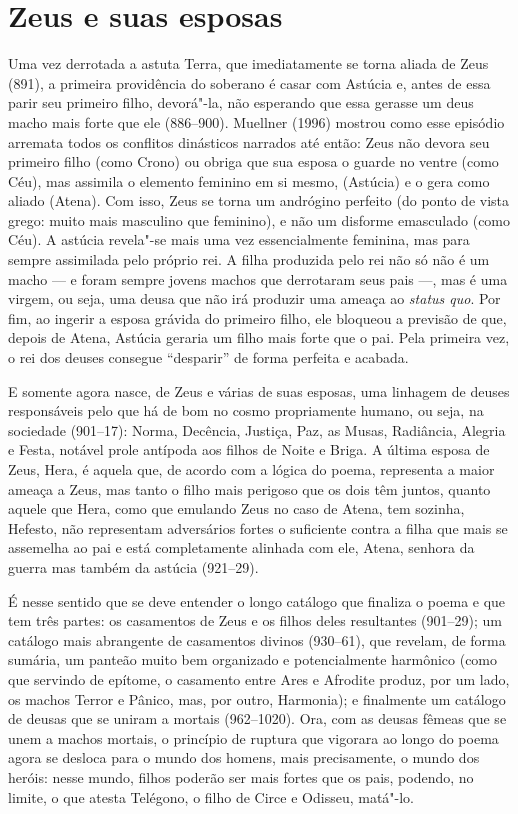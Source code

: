 \section{Zeus e suas esposas}

Uma vez derrotada a astuta Terra, que imediatamente se torna aliada de
Zeus (891), a primeira providência do soberano é casar com Astúcia e,
antes de essa parir seu primeiro filho, devorá"-la, não esperando que
essa gerasse um deus macho mais forte que ele (886--900). Muellner (1996)
mostrou como esse episódio arremata todos os conflitos dinásticos
narrados até então: Zeus não devora seu primeiro filho (como Crono) ou
obriga que sua esposa o guarde no ventre (como Céu), mas assimila o
elemento feminino em si mesmo, (Astúcia) e o gera como aliado (Atena).
Com isso, Zeus se torna um andrógino perfeito (do ponto de vista grego:
muito mais masculino que feminino), e não um disforme emasculado (como
Céu). A astúcia revela"-se mais uma vez essencialmente feminina, mas para
sempre assimilada pelo próprio rei. A filha produzida pelo rei não só
não é um macho --- e foram sempre jovens machos que derrotaram seus pais
---, mas é uma virgem, ou seja, uma deusa que não irá produzir uma ameaça
ao \emph{status quo}. Por fim, ao ingerir a esposa grávida do primeiro
filho, ele bloqueou a previsão de que, depois de Atena, Astúcia geraria
um filho mais forte que o pai. Pela primeira vez, o rei dos deuses
consegue ``desparir'' de forma perfeita e acabada.

E somente agora nasce, de Zeus e várias de suas esposas, uma linhagem de
deuses responsáveis pelo que há de bom no cosmo propriamente humano, ou
seja, na sociedade (901--17): Norma, Decência, Justiça, Paz, as Musas,
Radiância, Alegria e Festa, notável prole antípoda aos filhos de Noite e
Briga. A última esposa de Zeus, Hera, é aquela que, de acordo com a
lógica do poema, representa a maior ameaça a Zeus, mas tanto o filho
mais perigoso que os dois têm juntos, quanto aquele que Hera, como que
emulando Zeus no caso de Atena, tem sozinha, Hefesto, não representam
adversários fortes o suficiente contra a filha que mais se assemelha ao
pai e está completamente alinhada com ele, Atena, senhora da guerra mas
também da astúcia (921--29).

É nesse sentido que se deve entender o longo catálogo que finaliza o
poema e que tem três partes: os casamentos de Zeus e os filhos deles
resultantes (901--29); um catálogo mais abrangente de casamentos divinos
(930--61), que revelam, de forma sumária, um panteão muito bem organizado
e potencialmente harmônico (como que servindo de epítome, o casamento
entre Ares e Afrodite produz, por um lado, os machos Terror e Pânico,
mas, por outro, Harmonia); e finalmente um catálogo de deusas que se
uniram a mortais (962--1020). Ora, com as deusas fêmeas que se unem a
machos mortais, o princípio de ruptura que vigorara ao longo do poema
agora se desloca para o mundo dos homens, mais precisamente, o mundo dos
heróis: nesse mundo, filhos poderão ser mais fortes que os pais,
podendo, no limite, o que atesta Telégono, o filho de Circe e Odisseu,
matá"-lo.

